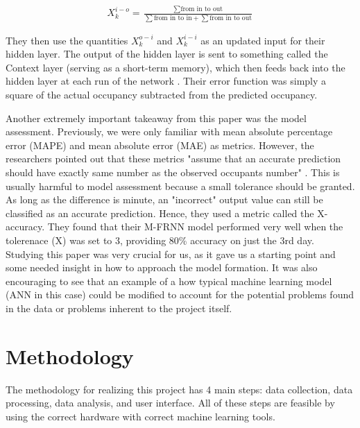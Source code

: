 \documentclass[journal, 12pt]{IEEEtran}
\begin{document}
\begin{equation}
    \begin{split}
        X_{k}^{i-o} = \frac{\sum{\text{from in to out}}}{\sum{\text{from in to in}} + \sum{\text{from in to out}}}
    \end{split}
    \label{eq:}
\end{equation}

\medskip
\noindent They then use the quantities $X_{k}^{o-i}$ and $X_{k}^{i-i}$ as an updated input for their hidden layer. The output of the hidden layer is sent to something called the Context layer (serving as a short-term memory), which then feeds back into the hidden layer at each run of the network \cite{wang2018occupancy}. Their error function was simply a square of the actual occupancy subtracted from the predicted occupancy\cite{wang2018occupancy}.

\noindent Another extremely important takeaway from this paper was the model assessment. Previously, we were only familiar with mean absolute percentage error (MAPE) and mean absolute error (MAE) as metrics. However, the researchers pointed out that these metrics "assume that an accurate prediction should have exactly
same number as the observed occupants number" \cite{wang2018occupancy}. This is usually harmful to model assessment because a small tolerance should be granted. As long as the difference is minute, an "incorrect" output value can still be classified as an accurate prediction. Hence, they used a metric called the X-accuracy. They found that their M-FRNN model performed very well when the tolerenace (X) was set to 3, providing 80\% accuracy on just the 3rd day. \\

\noindent Studying this paper was very crucial for us, as it gave us a starting point and some needed insight in how to approach the model formation. It was also encouraging to see that an example of a how typical machine learning model (ANN in this case) could be modified to account for the potential problems found in the data or problems inherent to the project itself. 



\section{Methodology}
\noindent The methodology for realizing this project has 4 main steps: data collection, data processing, data analysis, and user interface. All of these steps are feasible by using the correct hardware with correct machine learning tools.
\end{document}
